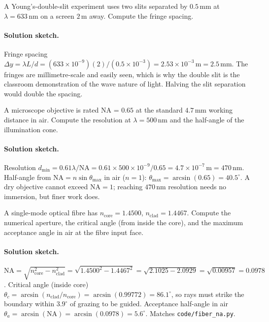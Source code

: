 \begin{exercise}
A Young's-double-slit experiment uses two slits separated by
$0.5\,\si{\milli\meter}$ at $\lambda = 633\,\si{\nano\meter}$ on a
screen $2\,\si{\meter}$ away. Compute the fringe spacing.
\paragraph{Solution sketch.} Fringe spacing
$\Delta y = \lambda L/d = (633\times10^{-9})(2)/(0.5\times10^{-3}) =
2.53\times10^{-3}\,\si{\meter} = 2.5\,\si{\milli\meter}$. The fringes
are millimetre-scale and easily seen, which is why the double slit is
the classroom demonstration of the wave nature of light. Halving the
slit separation would double the spacing.
\end{exercise}

\begin{exercise}
A microscope objective is rated NA = $0.65$ at the standard $4.7\,\si{
\milli\meter}$ working distance in air. Compute the resolution at
$\lambda = 500\,\si{\nano\meter}$ and the half-angle of the
illumination cone.
\paragraph{Solution sketch.} Resolution
$d_{\min} = 0.61\lambda/\text{NA} = 0.61\times 500\times10^{-9}/0.65 =
4.7\times10^{-7}\,\si{\meter} = 470\,\si{\nano\meter}$. Half-angle from
$\text{NA} = n\sin\theta_{\max}$ in air ($n = 1$):
$\theta_{\max} = \arcsin(0.65) = 40.5^{\circ}$. A dry objective cannot
exceed $\text{NA} = 1$; reaching $470\,\si{\nano\meter}$ resolution
needs no immersion, but finer work does.
\end{exercise}

\begin{exercise}
A single-mode optical fibre has $n_{\text{core}} = 1.4500$,
$n_{\text{clad}} = 1.4467$. Compute the numerical aperture, the
critical angle (from inside the core), and the maximum acceptance
angle in air at the fibre input face.
\paragraph{Solution sketch.}
$\text{NA} = \sqrt{n_{\text{core}}^{2} - n_{\text{clad}}^{2}} =
\sqrt{1.4500^{2} - 1.4467^{2}} = \sqrt{2.1025 - 2.0929} =
\sqrt{0.00957} = 0.0978$. Critical angle (inside core)
$\theta_{c} = \arcsin(n_{\text{clad}}/n_{\text{core}}) =
\arcsin(0.99772) = 86.1^{\circ}$, so rays must strike the boundary
within $3.9^{\circ}$ of grazing to be guided. Acceptance half-angle in
air $\theta_{a} = \arcsin(\text{NA}) = \arcsin(0.0978) = 5.6^{\circ}$.
Matches \texttt{code/fiber\_na.py}.
\end{exercise}

